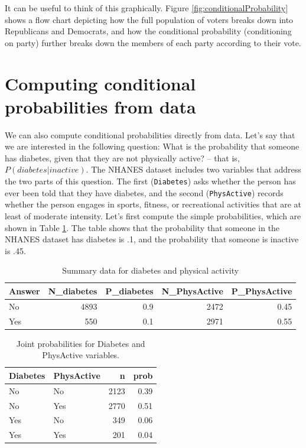 \documentclass[12pt,]{book}
\theoremstyle{definition}
\theoremstyle{definition}
\theoremstyle{definition}
\theoremstyle{remark}
\begin{document}
It can be useful to think of this graphically. Figure \ref{fig:conditionalProbability} shows a flow chart depicting how the full population of voters breaks down into Republicans and Democrats, and how the conditional probability (conditioning on party) further breaks down the members of each party according to their vote.

\hypertarget{computing-conditional-probabilities-from-data}{%
\section{Computing conditional probabilities from data}\label{computing-conditional-probabilities-from-data}}

We can also compute conditional probabilities directly from data. Let's say that we are interested in the following question: What is the probability that someone has diabetes, given that they are not physically active? -- that is, \(P(diabetes|inactive)\). The NHANES dataset includes two variables that address the two parts of this question. The first (\texttt{Diabetes}) asks whether the person has ever been told that they have diabetes, and the second (\texttt{PhysActive}) records whether the person engages in sports, fitness, or recreational activities that are at least of moderate intensity. Let's first compute the simple probabilities, which are shown in Table \ref{tab:simpleProb}. The table shows that the probability that someone in the NHANES dataset has diabetes is .1, and the probability that someone is inactive is .45.

\begin{table}

\caption{\label{tab:simpleProb}Summary data for diabetes and physical activity}
\centering
\begin{tabular}[t]{l|r|r|r|r}
\hline
Answer & N\_diabetes & P\_diabetes & N\_PhysActive & P\_PhysActive\\
\hline
No & 4893 & 0.9 & 2472 & 0.45\\
\hline
Yes & 550 & 0.1 & 2971 & 0.55\\
\hline
\end{tabular}
\end{table}

\begin{table}

\caption{\label{tab:jointProb}Joint probabilities for Diabetes and PhysActive variables.}
\centering
\begin{tabular}[t]{l|l|r|r}
\hline
Diabetes & PhysActive & n & prob\\
\hline
No & No & 2123 & 0.39\\
\hline
No & Yes & 2770 & 0.51\\
\hline
Yes & No & 349 & 0.06\\
\hline
Yes & Yes & 201 & 0.04\\
\hline
\end{tabular}
\end{table}
\end{document}
